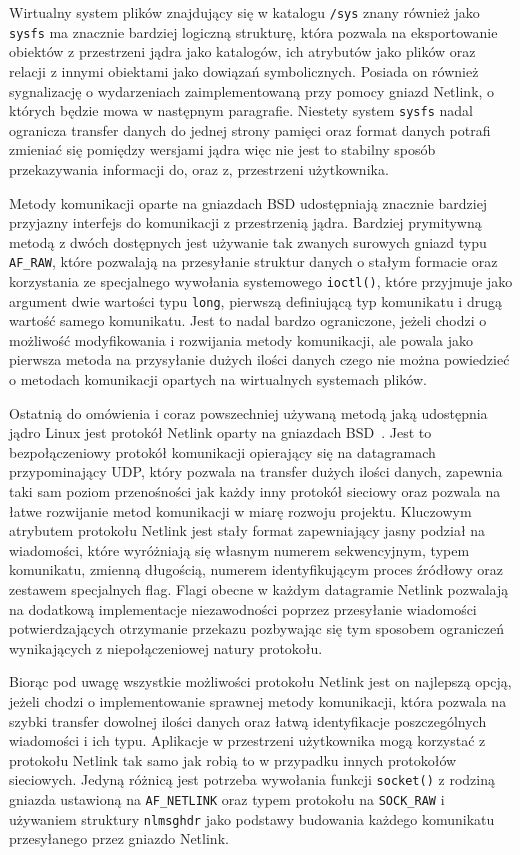 \documentclass[11pt]{scrartcl}
\begin{document}
Wirtualny system plików znajdujący się w katalogu \texttt{/sys} znany również jako \texttt{sysfs} ma znacznie bardziej logiczną strukturę, która pozwala na eksportowanie obiektów z przestrzeni jądra jako katalogów, ich atrybutów jako plików oraz relacji z innymi obiektami jako dowiązań symbolicznych. Posiada on również sygnalizację o wydarzeniach zaimplementowaną przy pomocy gniazd Netlink, o których będzie mowa w następnym paragrafie. Niestety system \texttt{sysfs} nadal ogranicza transfer danych do jednej strony pamięci oraz format danych potrafi zmieniać się pomiędzy wersjami jądra więc nie jest to stabilny sposób przekazywania informacji do, oraz z, przestrzeni użytkownika.

Metody komunikacji oparte na gniazdach BSD udostępniają znacznie bardziej przyjazny interfejs do komunikacji z przestrzenią jądra.  Bardziej prymitywną metodą z dwóch dostępnych jest używanie tak zwanych surowych gniazd typu \texttt{AF\_RAW}, które pozwalają na przesyłanie struktur danych o stałym formacie oraz korzystania ze specjalnego wywołania systemowego \texttt{ioctl()}, które przyjmuje jako argument dwie wartości typu \texttt{long}, pierwszą definiującą typ komunikatu i drugą wartość samego komunikatu. Jest to nadal bardzo ograniczone, jeżeli chodzi o możliwość modyfikowania i rozwijania metody komunikacji, ale powala jako pierwsza metoda na przysyłanie dużych ilości danych czego nie można powiedzieć o metodach komunikacji opartych na wirtualnych systemach plików.

Ostatnią do omówienia i coraz powszechniej używaną metodą jaką udostępnia jądro Linux jest protokół Netlink oparty na gniazdach BSD\@~\cite{userkernelcomm}.  Jest to bezpołączeniowy protokół komunikacji opierający się na datagramach przypominający UDP, który pozwala na transfer dużych ilości danych, zapewnia taki sam poziom przenośności jak każdy inny protokół sieciowy oraz pozwala na łatwe rozwijanie metod komunikacji w miarę rozwoju projektu. Kluczowym atrybutem protokołu Netlink jest stały format zapewniający jasny podział na wiadomości, które wyróżniają się własnym numerem sekwencyjnym, typem komunikatu, zmienną długością, numerem identyfikującym proces źródłowy oraz zestawem specjalnych flag.  Flagi obecne w każdym datagramie Netlink pozwalają na dodatkową implementacje niezawodności poprzez przesyłanie wiadomości potwierdzających otrzymanie przekazu pozbywając się tym sposobem ograniczeń wynikających z niepołączeniowej natury protokołu.

Biorąc pod uwagę wszystkie możliwości protokołu Netlink jest on najlepszą opcją, jeżeli chodzi o implementowanie sprawnej metody komunikacji, która pozwala na szybki transfer dowolnej ilości danych oraz łatwą identyfikacje poszczególnych wiadomości i ich typu. Aplikacje w przestrzeni użytkownika mogą korzystać z protokołu Netlink tak samo jak robią to w przypadku innych protokołów sieciowych. Jedyną różnicą jest potrzeba wywołania funkcji \texttt{socket()} z rodziną gniazda ustawioną na \texttt{AF\_NETLINK} oraz typem protokołu na \texttt{SOCK\_RAW} i używaniem struktury \texttt{nlmsghdr} jako podstawy budowania każdego komunikatu przesyłanego przez gniazdo Netlink.
\end{document}
